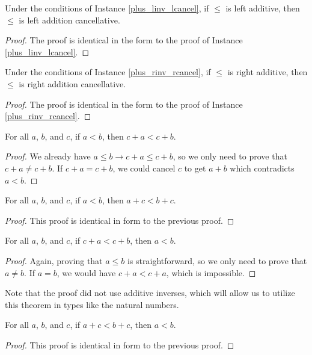 \documentclass[../../math.tex]{subfiles}
\begin{document}
\begin{instance}
    Under the conditions of Instance \ref{plus_linv_lcancel}, if $\leq$ is left
    additive, then $\leq$ is left addition cancellative.
\end{instance}
\begin{proof}
    The proof is identical in the form to the proof of Instance
    \ref{plus_linv_lcancel}.
\end{proof}

\begin{instance}
    Under the conditions of Instance \ref{plus_rinv_rcancel}, if $\leq$ is right
    additive, then $\leq$ is right addition cancellative.
\end{instance}
\begin{proof}
    The proof is identical in the form to the proof of Instance
    \ref{plus_rinv_rcancel}.
\end{proof}

\begin{theorem}
    For all $a$, $b$, and $c$, if $a < b$, then $c + a < c + b$.
\end{theorem}
\begin{proof}
    We already have $a \leq b \rightarrow c + a \leq c + b$, so we only need to
    prove that $c + a \neq c + b$.  If $c + a = c + b$, we could cancel $c$ to
    get $a + b$ which contradicts $a < b$.
\end{proof}

\begin{theorem}
    For all $a$, $b$, and $c$, if $a < b$, then $a + c < b + c$.
\end{theorem}
\begin{proof}
    This proof is identical in form to the previous proof.
\end{proof}

\begin{theorem}
    For all $a$, $b$, and $c$, if $c + a < c + b$, then $a < b$.
\end{theorem}
\begin{proof}
    Again, proving that $a \leq b$ is straightforward, so we only need to prove
    that $a \neq b$.  If $a = b$, we would have $c + a < c + a$, which is
    impossible.
\end{proof}
\noindent Note that the proof did not use additive inverses, which will allow us
to utilize this theorem in types like the natural numbers.

\begin{theorem}
    For all $a$, $b$, and $c$, if $a + c < b + c$, then $a < b$.
\end{theorem}
\begin{proof}
    This proof is identical in form to the previous proof.
\end{proof}
\end{document}
